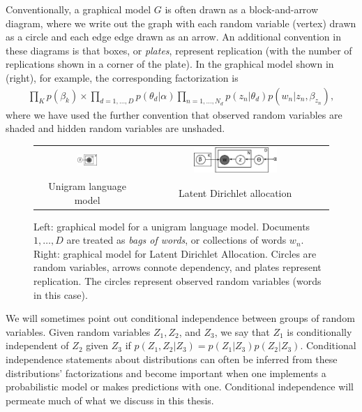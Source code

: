 Conventionally, a graphical model $G$ is often drawn as a
block-and-arrow diagram, where we write out the graph with each random
variable (vertex) drawn as a circle and each edge edge drawn as an
arrow.  An additional convention in these diagrams is that boxes, or
\emph{plates}, represent replication (with the number of replications
shown in a corner of the plate). In the graphical model shown in
 (right), for example, the corresponding
factorization is
\begin{align}
  \prod_K p(\beta_k) \times \prod_{d=1,\ldots,D} p(\theta_d | \alpha) \prod_{n=1,\ldots,N_d} p(z_n | \theta_d) p(w_n | z_n, \beta_{z_n}),
\end{align}
where we have used the further convention that observed random
variables are shaded and hidden random variables are unshaded.

\begin{figure}
  \begin{center}
    \begin{tabular}{cc}
      \includegraphics[width=0.2\textwidth]{chapter_introductory_material/figs/bagofwords_gm.pdf} & 
      \includegraphics[width=0.4667\textwidth]{chapter_introductory_material/figs/lda_gm.pdf} \\
      Unigram language model & Latent Dirichlet allocation \\
    \end{tabular}
  \end{center}
  \caption{Left: graphical model for a unigram language model.
    Documents $1, \ldots, D$ are treated as \emph{bags of words}, or
    collections of words $w_n$.  Right: graphical model for Latent
    Dirichlet Allocation.  Circles are random variables, arrows
    connote dependency, and plates represent replication.  The circles
    represent observed random variables (words in this case).}
  \label{fig:bagofwords_lda_gm}
\end{figure}

We will sometimes point out conditional independence between groups of
random variables.  Given random variables $Z_1, Z_2$, and $Z_3$, we
say that $Z_1$ is conditionally independent of $Z_2$ given $Z_3$ if
$p(Z_1, Z_2 | Z_3) = p(Z_1 | Z_3) p(Z_2 | Z_3)$.  Conditional
independence statements about distributions can often be inferred from
these distributions' factorizations and become important when one
implements a probabilistic model or makes predictions with
one. Conditional independence will permeate much of what we discuss in
this thesis.

